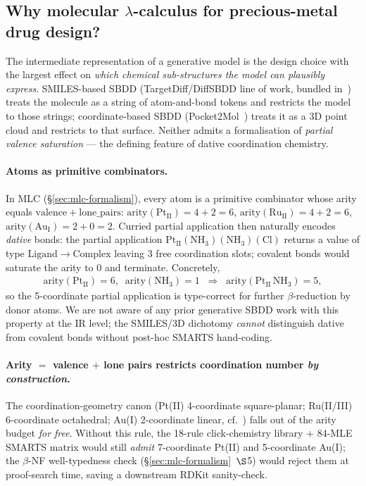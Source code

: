\subsection{Why molecular $\lambda$-calculus for precious-metal drug design?}
\label{sec:discussion:mlc}

The intermediate representation of a generative model is the design
choice with the largest effect on \emph{which chemical sub-structures
the model can plausibly express}. SMILES-based SBDD
(TargetDiff/DiffSBDD line of work, bundled in~\cite{sbd_papers_2023})
treats the molecule as a string of atom-and-bond tokens and restricts
the model to those strings; coordinate-based SBDD
(Pocket2Mol~\cite{peng2022pocket2mol}) treats it as a 3D point
cloud and restricts to that surface. Neither admits a formalisation
of \emph{partial valence saturation} --- the defining feature of
dative coordination chemistry.

\paragraph{Atoms as primitive combinators.}
In MLC (\S\ref{sec:mlc-formalism}), every atom is a primitive
combinator whose arity equals $\mathrm{valence} + \mathrm{lone\_pairs}$:
$\mathrm{arity}(\mathrm{Pt_{II}}) = 4 + 2 = 6$,
$\mathrm{arity}(\mathrm{Ru_{II}}) = 4 + 2 = 6$,
$\mathrm{arity}(\mathrm{Au_{I}}) = 2 + 0 = 2$. Curried partial
application then naturally encodes \emph{dative} bonds: the partial
application $\mathrm{Pt_{II}}(\mathrm{NH_3})(\mathrm{NH_3})(\mathrm{Cl})$
returns a value of type $\mathrm{Ligand}\to\mathrm{Complex}$ leaving
3 free coordination slots; covalent bonds would saturate the arity
to 0 and terminate. Concretely,
\begin{align*}
  \mathrm{arity}(\mathrm{Pt_{II}}) = 6,
  \;\; \mathrm{arity}(\mathrm{NH_3}) = 1
  \;\;\Rightarrow\;\;
  \mathrm{arity}(\mathrm{Pt_{II}}\,\mathrm{NH_3}) = 5,
\end{align*}
so the 5-coordinate partial application is type-correct for further
$\beta$-reduction by donor atoms. We are not aware of any prior
generative SBDD work with this property at the IR level; the
SMILES/3D dichotomy \emph{cannot} distinguish dative from covalent
bonds without post-hoc SMARTS hand-coding.

\paragraph{Arity $=$ valence $+$ lone pairs restricts coordination
number \emph{by construction}.}
The coordination-geometry canon (Pt(II) 4-coordinate square-planar;
Ru(II/III) 6-coordinate octahedral; Au(I) 2-coordinate linear, cf.\
\cite{footnote:metallodrug_review}) falls out of the arity budget
\emph{for free}. Without this rule, the 18-rule click-chemistry
library + 84-MLE SMARTS matrix would still \emph{admit}
7-coordinate Pt(II) and 5-coordinate Au(I); the $\beta$-NF
well-typedness check (\S\ref{sec:mlc-formalism}~$\S$5) would reject
them at proof-search time, saving a downstream RDKit sanity-check.

